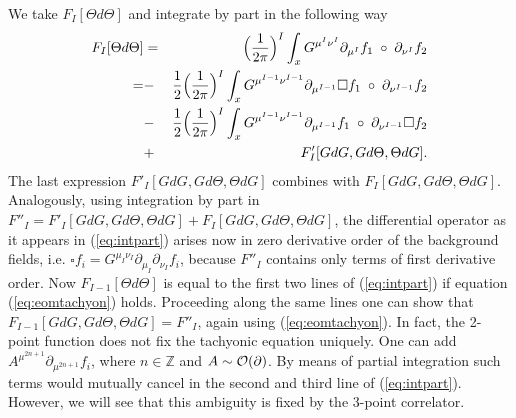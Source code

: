 \documentclass[a4paper,11pt]{article}               \def\new#1\endnew{{\bf #1}}
\newcommand {\cF} {{\cal F}}
\newcommand {\cO}{{\cal O}}
\newcommand {\bbZ}{\mathbb{Z}}
\begin{document}
We take $F_I[\Theta d\Theta]$ and integrate by part in the following way
\begin{eqnarray}
  \label{eq:intpart}
  F_I[\Theta d\Theta] &=& \Bigl(\frac{1}{2\pi}\Bigr)^I \int _x G^{\mu^I\nu^I}
          \partial_{\mu^I} f_1 \; \circ \;\partial_{\nu^I}f_2
\\
    =  &-& \frac 12 \Bigl(\frac{1}{2\pi}\Bigr)^I \int _x G^{\mu^{I-1}\nu^{I-1}}
          \partial_{\mu^{I-1}} 
          \square f_1
          \; \circ \; \partial_{\nu^{I-1}}f_2
\nonumber\\
      &-& \frac 12 \Bigl(\frac{1}{2\pi}\Bigr)^I \int _x G^{\mu^{I-1}\nu^{I-1}}
          \partial_{\mu^{I-1}} f_1
          \; \circ \; \partial_{\nu^{I-1}}
          \square f_2
\nonumber\\
      &+& F'_I[GdG,Gd\Theta,\Theta dG].
\nonumber
\end{eqnarray}
The last expression $F'_I[GdG,Gd\Theta,\Theta dG]$ combines with
$F_I[GdG,Gd\Theta,\Theta dG]$.
Analogously, using integration by part in 
$F''_I=F'_I[GdG,Gd\Theta,\Theta dG] + F_I[GdG,Gd\Theta,\Theta dG]$, 
the differential operator as it appears in (\ref{eq:intpart}) arises
now in zero derivative order of the background fields, i.e.
$\square f_i = G^{\mu_I\nu_I} \partial_{\mu_I}\partial_{\nu_I} f_i$,
because $F''_I$ contains only terms of first derivative
order. Now $F_{I-1}[\Theta d\Theta]$ is equal to the first two lines of
(\ref{eq:intpart}) if equation (\ref{eq:eomtachyon}) holds. Proceeding 
along the same lines one can show that 
$F_{I-1}[GdG,Gd\Theta,\Theta dG] = F''_I$,
again using (\ref{eq:eomtachyon}).
In fact, the 2-point function does not fix the tachyonic equation uniquely.
One can add $A^{\mu^{2n+1}} \partial_{\mu^{2n+1}}f_i$, where
$n \in \bbZ$ and $A \sim \cO(\partial)$. By means of partial
integration such terms would mutually cancel
in the second and third line of (\ref{eq:intpart}). However, we will see 
that this ambiguity is fixed by the 3-point correlator.
\end{document}
